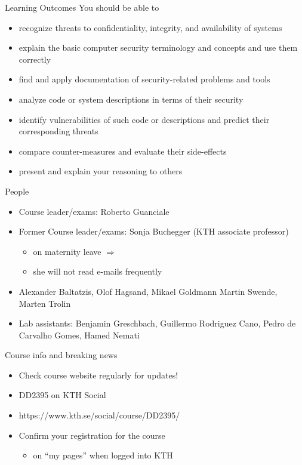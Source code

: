 \documentclass{beamer}
\begin{document}
\begin{frame}{Learning Outcomes}
  You should be able to
  \begin{itemize}
    \item recognize threats to confidentiality, integrity, and
      availability of systems
    \item explain the basic computer security terminology and concepts
      and use them correctly 
    \item find and apply documentation of security-related problems
      and tools 
    \item analyze code or system descriptions in terms
      of their security
    \item identify vulnerabilities of such code or descriptions and
      predict their corresponding threats
    \item compare counter-measures and evaluate their side-effects
    \item present and explain your reasoning to others
  \end{itemize}
\end{frame}

\begin{frame}{People}
  \begin{itemize}
    \item Course leader/exams: Roberto Guanciale
    \item Former Course leader/exams: Sonja Buchegger (KTH associate
      professor)
      \begin{itemize}
        \item on maternity leave $\Rightarrow$
        \item she will not read e-mails frequently
      \end{itemize}
    \item Alexander Baltatzis,
      Olof Hagsand,
      Mikael Goldmann
      Martin Swende,
      Marten Trolin
    \item Lab assistants: 
      Benjamin Greschbach,
      Guillermo Rodriguez Cano,
      Pedro de Carvalho Gomes,
      Hamed Nemati
  \end{itemize}
\end{frame}

\begin{frame}{Course info and breaking news}
  \begin{itemize}
    \item Check course website regularly for updates!
    \item DD2395 on KTH Social
    \item https://www.kth.se/social/course/DD2395/
    \item \alert{Confirm your registration for the course}
      \begin{itemize}
        \item on ``my pages'' when logged into KTH
      \end{itemize}
  \end{itemize}
\end{frame}
\end{document}
